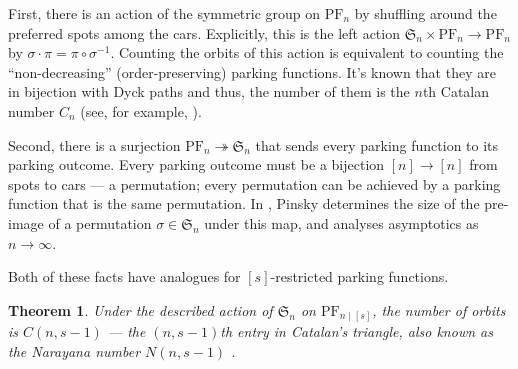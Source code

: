 \documentclass[12 pt]{amsart}
\newtheorem{theorem}{Theorem}[section]
\theoremstyle{definition} %
\theoremstyle{remark} %
\begin{document}
First, there is an action of the symmetric group on $\mathrm{PF}_{n}$ by shuffling around the preferred spots among the cars. Explicitly, this is the left action $\mathfrak{S}_{n} \times \mathrm{PF}_{n} \to \mathrm{PF}_{n}$ by $\sigma \cdot \pi = \pi \circ \sigma^{-1}$. Counting the orbits of this action is equivalent to counting the ``non-decreasing'' (order-preserving) parking functions. It's known that they are in bijection with Dyck paths and thus, the number of them is the $n$th Catalan number $C_{n}$ (see, for example, \cite{armstrong-loehr-warrington-2016}).

Second, there is a surjection $\mathrm{PF}_{n} \twoheadrightarrow \mathfrak{S}_{n}$ that sends every parking function to its parking outcome. Every parking outcome must be a bijection $[n] \to [n]$ from spots to cars --- a permutation; every permutation can be achieved by a parking function that is the same permutation. In \cite{pinsky-2024}, Pinsky determines the size of the pre-image of a permutation $\sigma \in \mathfrak{S}_{n}$ under this map, and analyses asymptotics as $n \to \infty$.

Both of these facts have analogues for $[s]$-restricted parking functions.

\begin{theorem}
	Under the described action of $\mathfrak{S}_{n}$ on $\mathrm{PF}_{n \mid [s]}$, the number of orbits is $C(n, s - 1)$ --- the $(n, s - 1)$th entry in Catalan's triangle, also known as the Narayana number $N(n, s - 1)$ \cite[A001263]{oeis}.
\end{theorem} 
\end{document}
